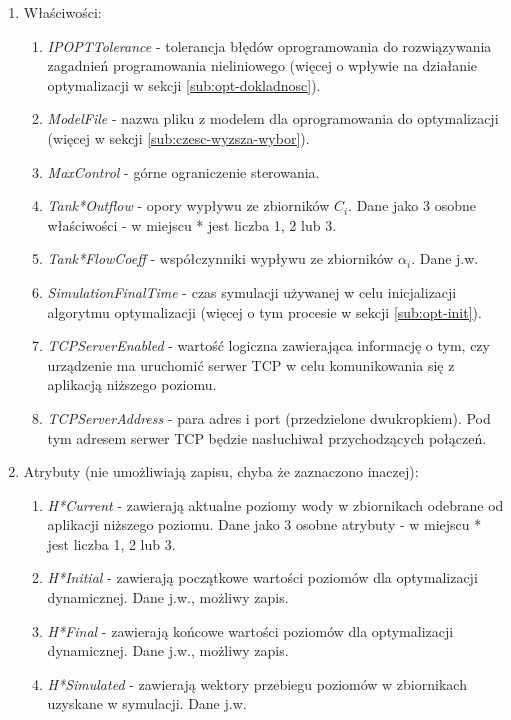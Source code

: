 \begin{enumerate}
    \item Właściwości:
    \begin{enumerate}
        \item \emph{IPOPTTolerance} - tolerancja błędów oprogramowania do rozwiązywania zagadnień programowania nieliniowego (więcej o wpływie na działanie optymalizacji w sekcji \ref{sub:opt-dokladnosc}).
        \item \emph{ModelFile} - nazwa pliku z modelem dla oprogramowania do optymalizacji (więcej w sekcji \ref{sub:czesc-wyzsza-wybor}).
        \item \emph{MaxControl} - górne ograniczenie sterowania.
        \item \emph{Tank*Outflow} - opory wypływu ze zbiorników $C_{i}$. Dane jako 3 osobne właściwości - w miejscu * jest liczba 1, 2 lub 3.
        \item \emph{Tank*FlowCoeff} - współczynniki wypływu ze zbiorników $\alpha_{i}$. Dane j.w.
        \item \emph{SimulationFinalTime} - czas symulacji używanej w celu inicjalizacji algorytmu optymalizacji (więcej o tym procesie w sekcji \ref{sub:opt-init}).
        \item \emph{TCPServerEnabled} - wartość logiczna zawierająca informację o tym, czy urządzenie ma uruchomić serwer TCP w celu komunikowania się z aplikacją niższego poziomu.
        \item \emph{TCPServerAddress} - para adres i port (przedzielone dwukropkiem). Pod tym adresem serwer TCP będzie nasłuchiwał przychodzących połączeń.
    \end{enumerate}
    \item Atrybuty (nie umożliwiają zapisu, chyba że zaznaczono inaczej):
    \begin{enumerate}
        \item \emph{H*Current} - zawierają aktualne poziomy wody w zbiornikach odebrane od aplikacji niższego poziomu. Dane jako 3 osobne atrybuty - w miejscu * jest liczba 1, 2 lub 3.
        \item \emph{H*Initial} - zawierają początkowe wartości poziomów dla optymalizacji dynamicznej. Dane j.w., możliwy zapis.
        \item \emph{H*Final} - zawierają końcowe wartości poziomów dla optymalizacji dynamicznej. Dane j.w., możliwy zapis.
        \item \emph{H*Simulated} - zawierają wektory przebiegu poziomów w zbiornikach uzyskane w symulacji. Dane j.w.

\end{enumerate}
\end{enumerate}
